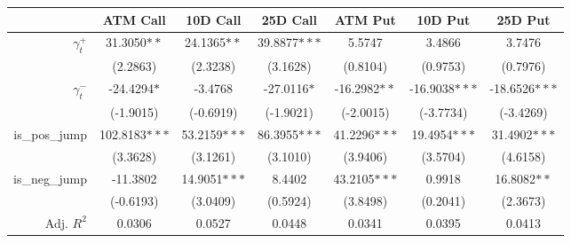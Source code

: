 \begin{tabular}{rSSSSSS}
\toprule
{} & {ATM Call} & {10D Call} & {25D Call} & {ATM Put} &  {10D Put} &  {25D Put} \\
\midrule
$\gamma^+_t$         &    31.3050$**$ &    24.1365$**$ &   39.8877$***$ &        5.5747 &         3.4866 &         3.7476 \\
            &       (2.2863) &       (2.3238) &       (3.1628) &      (0.8104) &       (0.9753) &       (0.7976) \\
$\gamma^-_t$         &    -24.4294$*$ &        -3.4768 &    -27.0116$*$ &  -16.2982$**$ &  -16.9038$***$ &  -18.6526$***$ \\
            &      (-1.9015) &      (-0.6919) &      (-1.9021) &     (-2.0015) &      (-3.7734) &      (-3.4269) \\
is\_pos\_jump &  102.8183$***$ &   53.2159$***$ &   86.3955$***$ &  41.2296$***$ &   19.4954$***$ &   31.4902$***$ \\
            &       (3.3628) &       (3.1261) &       (3.1010) &      (3.9406) &       (3.5704) &       (4.6158) \\
is\_neg\_jump &       -11.3802 &   14.9051$***$ &         8.4402 &  43.2105$***$ &         0.9918 &    16.8082$**$ \\
            &      (-0.6193) &       (3.0409) &       (0.5924) &      (3.8498) &       (0.2041) &       (2.3673) \\
\midrule
Adj. $R^2$ & 0.0306 & 0.0527 & 0.0448 & 0.0341 & 0.0395 & 0.0413\\\bottomrule
\end{tabular}
